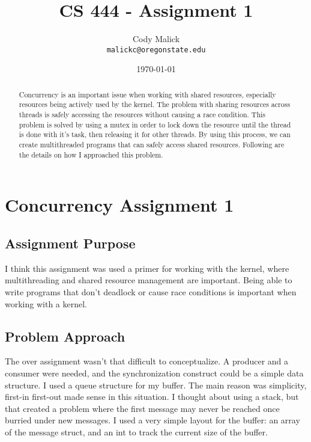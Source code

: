 \documentclass[10pt,letterpaper]{article}
\begin{document}
\begin{titlepage}
  \title{CS 444 - Assignment 1}
  \author{Cody Malick\\
  \texttt{malickc@oregonstate.edu}}
  \date{\today}
  \maketitle
  \vspace*{2cm}
  \begin{abstract}
      \noindent Concurrency is an important issue when working with shared resources,
      especially resources being actively used by the kernel.
      The problem with sharing resources across threads is safely
      accessing the resources without causing a race condition. This problem is
      solved by using a mutex in order to lock down the resource until the thread
      is done with it's task, then releasing it for other threads. By using this
      process, we can create multithreaded programs that can safely access shared
      resources. Following are the details on how I approached this problem.
  \end{abstract}

\end{titlepage}

\tableofcontents
\clearpage

\section{Concurrency Assignment 1}
  \subsection{Assignment Purpose}
    I think this assignment was used a primer for working with the kernel, where
    multithreading and shared resource management are important. Being able to
    write programs that don't deadlock or cause race conditions is important
    when working with a kernel.
  \subsection{Problem Approach}
    The over assignment wasn't that difficult to conceptualize. A producer and
    a consumer were needed, and the synchronization construct could be a simple
    data structure.
    \noindent I used a queue structure for my buffer. The main reason was
    simplicity, first-in first-out made sense in this situation. I thought about
    using a stack, but that created a problem where the first message may never
    be reached once burried under new messages.
    \noindent I used a very simple layout for the buffer: an array of the message
    struct, and an int to track the current size of the buffer.
\end{document}
